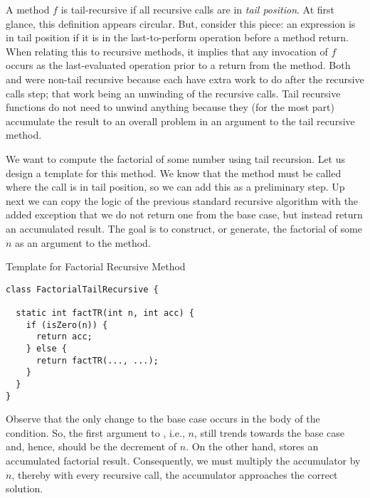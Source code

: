 A method $f$ is tail-recursive if all recursive calls are in \textit{tail position}. At first glance, this definition appears circular. But, consider this piece: an expression is in tail position if it is in the last-to-perform operation before a method return. When relating this to recursive methods, it implies that any invocation of $f$ occurs as the last-evaluated operation prior to a return from the method. Both  and  were non-tail recursive because each have extra work to do after the recursive calls step; that work being an unwinding of the recursive calls. Tail recursive functions do not need to unwind anything because they (for the most part) accumulate the result to an overall problem in an argument to the tail recursive method.

\example We want to compute the factorial of some number using tail recursion. Let us design a template for this method. We know that the method must be called where the call is in tail position, so we can add this as a preliminary step. Up next we can copy the logic of the previous standard recursive algorithm with the added exception that we do not return one from the base case, but instead return an accumulated result. The goal is to construct, or generate, the factorial of some $n$ as an argument to the method.

\begin{cl}[]{Template for Factorial Recursive Method}
\begin{lstlisting}[language=MyJava]
class FactorialTailRecursive {

  static int factTR(int n, int acc) {
    if (isZero(n)) {
      return acc;
    } else {
      return factTR(..., ...);
    }
  }
}
\end{lstlisting}
\end{cl}

Observe that the only change to the base case occurs in the body of the condition. So, the first argument to , i.e., $n$, still trends towards the base case and, hence, should be the decrement of $n$. On the other hand,  stores an accumulated factorial result. Consequently, we must multiply the accumulator by $n$, thereby with every recursive call, the accumulator approaches the correct solution.

